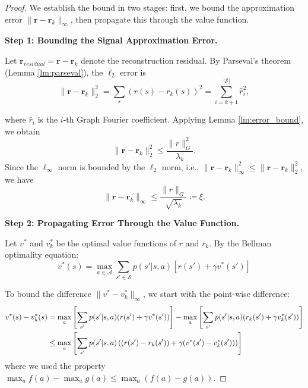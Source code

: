 \documentclass{article}
\theoremstyle{plain}
\theoremstyle{definition}
\theoremstyle{remark}
\begin{document}
\begin{proof}
We establish the bound in two stages: first, we bound the approximation error $\|\mathbf{r} - \mathbf{r}_k\|_{\infty}$, then propagate this through the value function.

\textbf{Step 1: Bounding the Signal Approximation Error.}

Let $\mathbf{r}_{residual} = \mathbf{r} - \mathbf{r}_k$ denote the reconstruction residual. By Parseval's theorem (Lemma \ref{lm:parseval}), the $\ell_2$ error is
\begin{equation}
    \|\mathbf{r} - \mathbf{r}_k\|_2^2 = \sum_s (r(s) - r_k(s))^2 = \sum_{i=k+1}^{|\mathscr{S}|} \hat{r}_i^2,
\end{equation}

where $\hat{r}_i$ is the $i$-th Graph Fourier coefficient. Applying Lemma \ref{lm:error_bound}, we obtain
\begin{equation}
    \|\mathbf{r} - \mathbf{r}_k\|_2^2 \leq \frac{\|r\|_G^2}{\lambda_k}.
\end{equation}
Since the $\ell_{\infty}$ norm is bounded by the $\ell_2$ norm, i.e., $\|\mathbf{r} - \mathbf{r}_k\|_{\infty}^2 \leq \|\mathbf{r} - \mathbf{r}_k\|_2^2$, we have
\begin{equation}
    \|\mathbf{r} - \mathbf{r}_k\|_{\infty} \leq \frac{\|r\|_G}{\sqrt{\lambda_k}} \coloneq \xi.
    \label{eq:approximation_error}
\end{equation}

\textbf{Step 2: Propagating Error Through the Value Function.}

Let $v^*$ and $v_k^*$ be the optimal value functions of $r$ and $r_k$. By the Bellman optimality equation:
\begin{equation}
    v^*(s) = \max_{a \in \mathscr{A}} \sum_{s' \in \mathscr{S}} p(s'|s,a) \left[ r(s') + \gamma v^*(s') \right]
\end{equation}

To bound the difference $\|v^* - v_k^*\|_\infty$, we start with the point-wise difference:
\begin{align}
    v^*(s) - v_k^*(s) &= \max_a \left[ \sum_{s'} p(s'|s,a) (r(s') + \gamma v^*(s')) \right] - \max_a \left[ \sum_{s'} p(s'|s,a) (r_k(s') + \gamma v_k^*(s')) \right] \notag \\
    &\leq \max_a \left[ \sum_{s'} p(s'|s,a) \left( (r(s') - r_k(s')) + \gamma(v^*(s') - v_k^*(s')) \right) \right]
\end{align}
where we used the property $\max_a f(a) - \max_a g(a) \leq \max_a (f(a) - g(a))$. 


\end{proof}
\end{document}
